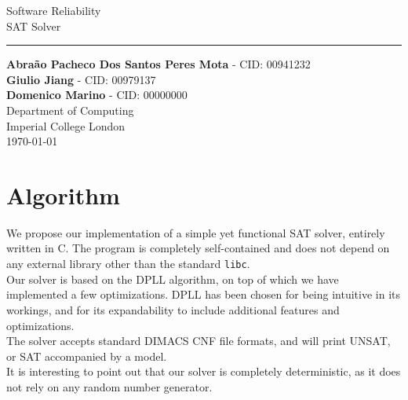 \documentclass[a4paper]{article}
\begin{document}
\begin{titlepage}
    \begin{center}
        \vspace*{1cm}
        \vspace*{1cm}          
        \vspace{0.5cm}
        \LARGE
        Software Reliability\\ SAT Solver\\
                \noindent\rule{8cm}{0.4pt}
        \vspace{1.5cm}
 
        \large
        \textbf{Abra\~{a}o Pacheco Dos Santos Peres Mota} - CID: 00941232 \\
        \textbf{Giulio Jiang} - CID: 00979137 \\
        \textbf{Domenico Marino} - CID: 00000000 \\

        \vfill
        \vspace{0.8cm}
        \Large
        Department of Computing\\
        Imperial College London\\
        \today
        
    \end{center}
\end{titlepage}


\newpage

\section{Algorithm}

We propose our implementation of a simple yet functional SAT solver, entirely written in C. The program is completely self-contained and does not depend on any external library other than the standard \texttt{libc}.\\

Our solver is based on the DPLL algorithm, on top of which we have implemented a few optimizations. DPLL has been chosen for being intuitive in its workings, and for its expandability to include additional features and optimizations.\\

The solver accepts standard DIMACS CNF file formats, and will print UNSAT, or SAT accompanied by a model.\\

It is interesting to point out that our solver is completely deterministic, as it does not rely on any random number generator.\\
\end{document}
